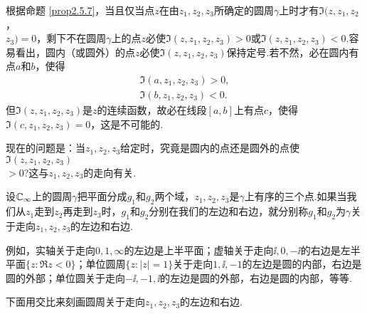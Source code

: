 根据命题 \ref{prop2.5.7}，当且仅当点$z$在由$z_1,z_2,z_3$所确定的圆周$\gamma$上时才有$\Im(z,z_1,z_2$，\\$z_3)=0$，剩下不在圆周$\gamma$上的点$z$必使$\Im(z,z_1,z_2,z_3)>0$或$\Im(z,z_1,z_2,z_3)<0$.容易看出，圆内（或圆外）的点$z$必使$\Im(z,z_1,z_2,z_3)$保持定号.若不然，必在圆内有点$a$和$b$，使得
\begin{gather*}
  \Im(a,z_1,z_2,z_3) > 0,\\
  \Im(b,z_1,z_2,z_3) < 0.
\end{gather*}
但$\Im(z,z_1,z_2,z_3)$是$z$的连续函数，故必在线段$[a,b]$上有点$c$，使得$\Im(c,z_1,z_2,z_3)=0$，这是不可能的.

现在的问题是：当$z_1,z_2,z_3$给定时，究竟是圆内的点还是圆外的点使$\Im(z,z_1,z_2,z_3)$\\$>0$?这与$z_1,z_2,z_3$的走向有关.
\begin{definition}\label{def2.5.8}
  设$\mathbb C_\infty$上的圆周$\gamma$把平面分成$g_1$和$g_2$两个域，$z_1,z_2,z_3$是$\gamma$上有序的三个点.如果当我们从$z_1$走到$z_2$再走到$z_3$时，$g_1$和$g_2$分别在我们的左边和右边，就分别称$g_1$和$g_2$为$\gamma$关于走向$z_1,z_2,z_3$的左边和右边.
\end{definition}

例如，实轴关于走向$0,1,\infty$的左边是上半平面；虚轴关于走向$\ii,0,-\ii$的右边是左半平面$\{z:\Re z<0\}$；单位圆周$\{z:|z|=1\}$关于走向$1,\ii,-1$的左边是圆的内部，右边是圆的外部；单位圆关于走向$-\ii,-1,\ii$的左边是圆的外部，右边是圆的内部，等等.

下面用交比来刻画圆周关于走向$z_1,z_2,z_3$的左边和右边.

